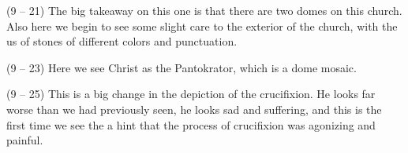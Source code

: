 \documentclass{article}
\begin{document}
\begin{spacing}{1.2}
        (9 -- 21) The big takeaway on this one is that there are two domes on this church. Also here we begin to see some slight care to the exterior of the church, with the us of stones of different colors and punctuation.

        (9 -- 23) Here we see Christ as the Pantokrator, which is a dome mosaic.

        (9 -- 25) This is a big change in the depiction of the crucifixion. He looks far worse than we had previously seen, he looks sad and suffering, and this is the first time we see the a hint that the process of crucifixion was agonizing and painful.
    \end{spacing}
\end{document}
